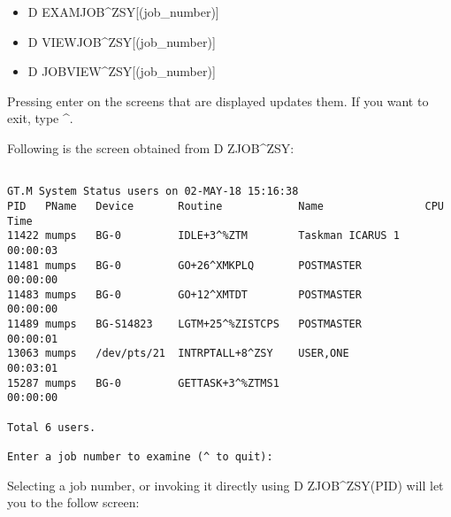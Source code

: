\documentclass[]{article}
\begin{document}
\begin{itemize}
	\item D EXAMJOB\^{}ZSY[(job\_number)]                                                      
	\item D VIEWJOB\^{}ZSY[(job\_number)]                                                       
	\item D JOBVIEW\^{}ZSY[(job\_number)] 
\end{itemize}

Pressing enter on the screens that are displayed updates them. If you want to exit, type \^{}.

Following is the screen obtained from D ZJOB\^{}ZSY:
\begin{lstlisting}

GT.M System Status users on 02-MAY-18 15:16:38
PID   PName   Device       Routine            Name                CPU Time
11422 mumps   BG-0         IDLE+3^%ZTM        Taskman ICARUS 1    00:00:03
11481 mumps   BG-0         GO+26^XMKPLQ       POSTMASTER          00:00:00
11483 mumps   BG-0         GO+12^XMTDT        POSTMASTER          00:00:00
11489 mumps   BG-S14823    LGTM+25^%ZISTCPS   POSTMASTER          00:00:01
13063 mumps   /dev/pts/21  INTRPTALL+8^ZSY    USER,ONE            00:03:01
15287 mumps   BG-0         GETTASK+3^%ZTMS1                       00:00:00

Total 6 users.

Enter a job number to examine (^ to quit): 
\end{lstlisting}

Selecting a job number, or invoking it directly using D ZJOB\^{}ZSY(PID) will let you to the follow screen:

\lstset{
	caption=Job Examination Screen
}
\pagebreak
\end{document}
